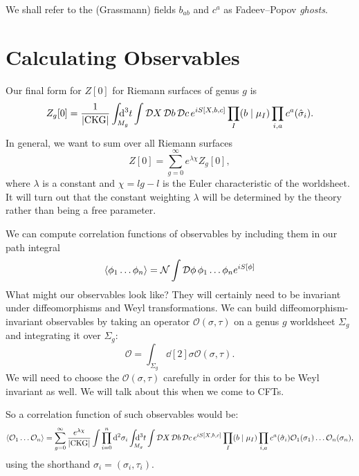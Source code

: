 
We shall refer to the (Grassmann) fields $b_{ab}$ and $c^a$ as Fadeev--Popov  \emph{ghosts}.

\section{Calculating Observables}%
\label{sec:calculating_observables}

Our final form for $Z[0]$  for Riemann surfaces of genus $g$ is
\begin{equation}
  Z_g[0] = \frac{1}{\abs{\text{CKG}}} \int_{\mathrlap{M_g}} \dd[3]{t} \int \pdd{X} \pdd{b} \pdd{c} e^{i S[X, b, c]} \prod_{I} (b \mid \mu_I) \prod_{i, a} c^a(\hat \sigma_i).
\end{equation}
In general, we want to sum over all Riemann surfaces
\begin{equation}
  Z[0] = \sum_{g=0}^{\infty} e^{\lambda \chi} Z_g[0],
\end{equation}
where $\lambda$ is a constant and $\chi = lg - l$ is the Euler characteristic of the worldsheet.
It will turn out that the constant weighting $\lambda$  will be determined by the theory rather than being a free parameter.

We can compute correlation functions of observables by including them in our path integral
\begin{equation}
  \langle \phi_1 \dots \phi_n \rangle = \mathcal{N} \int \mathop{\mathcal{D} \phi} \phi_1 \dots \phi_n e^{i S[\phi]}
\end{equation}
What might our observables look like?
They will certainly need to be invariant under diffeomorphisms and Weyl transformations.
We can build diffeomorphism-invariant observables by taking an operator $\mathcal{O}(\sigma, \tau)$  on a genus $g$  worldsheet $\Sigma_g$  and integrating it over $\Sigma_g$:
 \begin{equation}
   \mathcal{O} = \int_{\Sigma_g} \dd[2]{\sigma} \mathcal{O}(\sigma, \tau).
\end{equation}
We will need to choose the $\mathcal{O}(\sigma, \tau)$  carefully in order for this to be Weyl invariant as well. We will talk about this when we come to CFTs.

So a correlation function of such observables would be:
\begin{equation}
  \langle \mathcal{O}_1 \dots \mathcal{O}_n\rangle = \sum_{g=0}^{\infty} \frac{e^{\lambda \chi}}{\abs{\text{CKG}}} \int \prod_{i=0}^{n} \dd[2]{\sigma_i} \int_{\mathrlap{M_g}} \dd[3]{t} \int \pdd{ X} \pdd{b} \pdd{c} e^{i S[X, b , c]} \prod_I (b \suchthat \mu_I) \prod_{i, a} c^a(\hat{\sigma}_i) \mathcal{O}_1(\sigma_1) \dots \mathcal{O}_n(\sigma_n),
\end{equation}
using the shorthand $\sigma_i = (\sigma_i, \tau_i)$.

